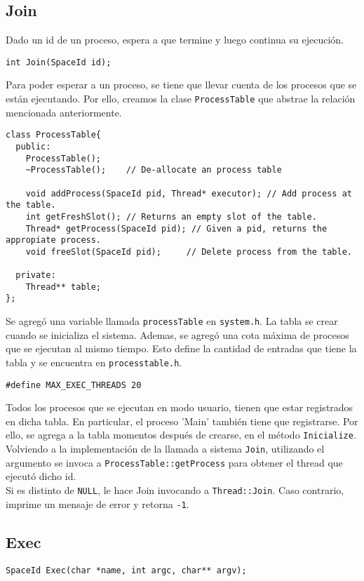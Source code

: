 \subsection*{Join}
Dado un id de un proceso, espera a que termine y luego continua su ejecución.
\begin{lstlisting}[style=C]
int Join(SpaceId id);
\end{lstlisting}
Para poder esperar a un proceso, se tiene que llevar cuenta de los procesos que se están ejecutando. Por ello, creamos la clase \texttt{ProcessTable} que abstrae la relación mencionada anteriormente.
\begin{lstlisting}[style=C]
class ProcessTable{
  public:
    ProcessTable();
    ~ProcessTable();	// De-allocate an process table

    void addProcess(SpaceId pid, Thread* executor); // Add process at the table.
    int getFreshSlot(); // Returns an empty slot of the table.
    Thread* getProcess(SpaceId pid); // Given a pid, returns the appropiate process.
    void freeSlot(SpaceId pid);		// Delete process from the table.

  private:
    Thread** table;
};
\end{lstlisting}
Se agregó una variable llamada \texttt{processTable} en \texttt{system.h}. La tabla se crear cuando se inicializa el sistema. Ademas, se agregó una cota máxima de procesos que se ejecutan al mismo tiempo. Esto define la cantidad de entradas que tiene la tabla y se encuentra en \texttt{processtable.h}.
\begin{lstlisting}[style=C]
#define MAX_EXEC_THREADS 20
\end{lstlisting}
Todos los procesos que se ejecutan en modo usuario, tienen que estar registrados en dicha tabla. En particular, el proceso 'Main' también tiene que registrarse. Por ello, se agrega a la tabla momentos después de crearse, en el método \texttt{Inicialize}.\\
Volviendo a la implementación de la llamada a sistema \texttt{Join}, utilizando el argumento se invoca a \texttt{ProcessTable::getProcess} para obtener el thread que ejecutó dicho id.\\
Si es distinto de \texttt{NULL}, le hace Join invocando a \texttt{Thread::Join}. Caso contrario, imprime un mensaje de error y retorna \texttt{-1}.
\subsection*{Exec}
\begin{lstlisting}[style=C]
SpaceId Exec(char *name, int argc, char** argv);
\end{lstlisting}
\section{}
\section{}
\section{}